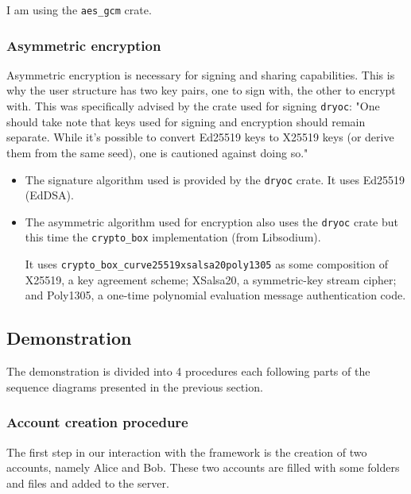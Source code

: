 I am using the \lstinline{aes_gcm} crate\cite{aesgcm}.

\subsubsection{Asymmetric encryption}
Asymmetric encryption is necessary for signing and sharing capabilities. This is why the user structure has two key pairs, one to sign with, the other to encrypt with. This was specifically advised by the crate used for signing \lstinline{dryoc}: "One should take note that keys used for signing and encryption should remain separate. While it’s possible to convert Ed25519 keys to X25519 keys (or derive them from the same seed), one is cautioned against doing so."\cite{dryocsign}

\begin{itemize}
    \item The signature algorithm used is provided by the \lstinline{dryoc} crate\cite{dryocsign}. It uses Ed25519 (EdDSA).
    \item The asymmetric algorithm used for encryption also uses the \lstinline{dryoc} crate but this time the \lstinline{crypto_box} implementation (from Libsodium)\cite{cryptobox}. 
    
    It uses \lstinline{crypto_box_curve25519xsalsa20poly1305} as some composition of X25519, a key agreement scheme; XSalsa20, a symmetric-key stream cipher; and Poly1305, a one-time polynomial evaluation message authentication code\cite{libsodium}\cite{libsodiumcrypto}.
\end{itemize}

\subsection{Demonstration}
The demonstration is divided into 4 procedures each following parts of the sequence diagrams presented in the previous section. 
\subsubsection{Account creation procedure}
The first step in our interaction with the framework is the creation of two accounts, namely Alice and Bob. These two accounts are filled with some folders and files and added to the server. 

